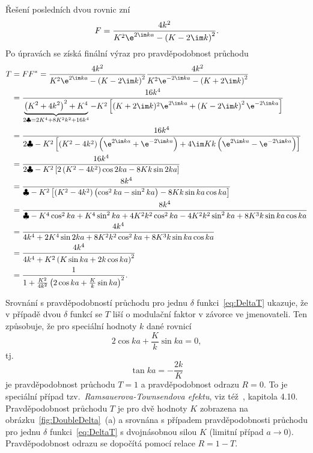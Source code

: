 \begin{solution}
\begin{enumerate}
		Řešení posledních dvou rovnic zní
		\begin{equation}
			F=\frac{4k^{2}}{K^{2}\e^{2\im ka}-\left(K-2\im k\right)^{2}}.
			\label{eq:2DeltaF}
		\end{equation}
		Po úpravách se získá finální výraz pro pravděpodobnost průchodu
		\begin{align}
			T&=FF^{*}
				=\frac{4k^{2}}{K^{2}\e^{2\im ka}-\left(K-2\im k\right)^{2}}
					\frac{4k^{2}}{K^{2}\e^{-2\im ka}-\left(K+2\im k\right)^{2}}\nonumber\\
			 &=\frac{16k^{4}}{\underbrace{\left(K^{2}+4k^{2}\right)^{2}+K^{4}}
				_{2\clubsuit=2K^{4}+8K^{2}k^{2}+16k^{4}}-K^{2}\left[(K+2\im k)^{2}\e^{2\im ka}
				+\left(K-2\im k\right)^{2}\e^{-2\im ka}\right]}\nonumber\\
			 &=\frac{16k^{4}}{2\clubsuit-K^{2}\left[\left(K^{2}-4k^{2}\right)
				\left(\e^{2\im ka}+\e^{-2\im ka}\right)+4\im Kk\left(\e^{2\im ka}
				-\e^{-2\im ka}\right)\right]}\nonumber\\
			 &=\frac{16k^{4}}{2\clubsuit-K^{2}\left[2\left(K^{2}-4k^{2}\right)\cos{2ka}
				-8Kk\sin{2ka}\right]}\nonumber\\
			 &=\frac{8k^{4}}{\clubsuit-K^{2}\left[\left(K^{2}-4k^{2}\right)
				\left(\cos^{2}ka-\sin^{2}ka\right)-8Kk\sin{ka}\cos{ka}\right]}\nonumber\\
			 &=\frac{8k^{4}}{\clubsuit-K^{4}\cos^{2}ka+K^{4}\sin^{2}ka+4K^{2}k^{2}\cos^{2}ka
				-4K^{2}k^{2}\sin^{2}ka+8K^{3}k\sin{ka}\cos{ka}}\nonumber\\
			 &=\frac{4k^{4}}{4k^{4}+2K^{4}\sin{2}ka+8K^{2}k^{2}\cos^{2}ka
				+8K^{3}k\sin{ka}\cos{ka}}\nonumber\\
			 &=\frac{4k^{4}}{4k^{4}+K^{2}\left(K\sin{ka}+2k\cos{ka}\right)^{2}}\nonumber\\
			 &=\frac{1}{1+\frac{K^{2}}{4k^{2}}\left(2\cos{ka}+\frac{K}{k}\sin{ka}\right)^{2}}.
		\end{align}
        
        Srovnání s pravděpodobností průchodu pro jednu $\delta$ funkci~\eqref{eq:DeltaT} ukazuje, že v případě dvou $\delta$ funkcí se $T$ liší o modulační faktor v závorce ve jmenovateli.
		Ten způsobuje, že pro speciální hodnoty $k$ dané rovnicí
		\begin{equation}
			2\cos{ka}+\frac{K}{k}\sin{ka}=0,
		\end{equation}
		tj.
		\begin{equation}
            \tan{ka}
                =-\frac{2k}{K}
		\end{equation}		
		je pravděpodobnost průchodu $T=1$ a pravděpodobnost odrazu $R=0$.
		To je speciální případ tzv.~\emph{Ramsauerova-Townsendova efektu}, viz též~\cite{Capri2002}, kapitola 4.10.
		Pravděpodobnost průchodu $T$ je pro dvě hodnoty $K$ zobrazena na obrázku~\ref{fig:DoubleDelta}~(a) a srovnána s případem pravděpodobnosti průchodu pro jednu $\delta$ funkci~\eqref{eq:DeltaT} s dvojnásobnou silou $K$ (limitní případ $a\rightarrow0$).
		Pravděpodobnost odrazu se dopočítá pomocí relace $R=1-T$.	
		

\end{enumerate}
\end{solution}
